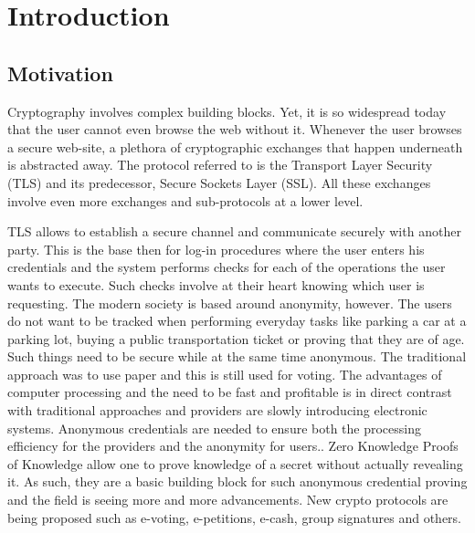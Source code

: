 \chapter{Introduction}

\section{Motivation}

Cryptography involves complex building blocks. Yet, it is so
widespread today that the user cannot even browse the web without
it. Whenever the user browses a secure web-site, a plethora of
cryptographic exchanges that happen underneath is abstracted away. The
protocol referred to is the Transport Layer Security (TLS) and its
predecessor, Secure Sockets Layer (SSL). All these exchanges involve
even more exchanges and sub-protocols at a lower level.

TLS allows to establish a secure channel and communicate securely with
another party. This is the base then for log-in procedures where the
user enters his credentials and the system performs checks for each of
the operations the user wants to execute. Such checks involve at their
heart knowing which user is requesting. The modern society is based
around anonymity, however. The users do not want to be tracked when
performing everyday tasks like parking a car at a parking lot, buying
a public transportation ticket or proving that they are of age. Such
things need to be secure while at the same time anonymous. The
traditional approach was to use paper and this is still used for
voting. The advantages of computer processing and the need to be fast
and profitable is in direct contrast with traditional approaches and
providers are slowly introducing electronic systems. Anonymous
credentials are needed to ensure both the processing efficiency for
the providers and the anonymity for users.. Zero Knowledge Proofs of
Knowledge allow one to prove knowledge of a secret without actually
revealing it. As such, they are a basic building block for such
anonymous credential proving and the field is seeing more and more
advancements. New crypto protocols are being proposed such as
e-voting, e-petitions, e-cash, group signatures and others.

